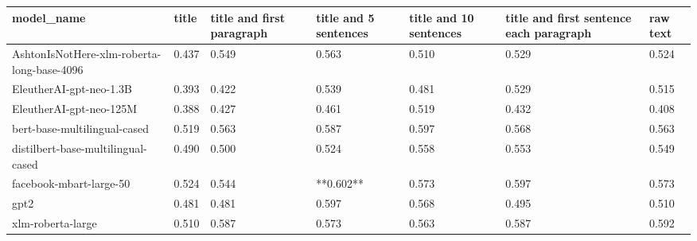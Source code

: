 \begin{tabular}{lllllll}
\toprule
                                model\_name & title & title and first paragraph & title and 5 sentences & title and 10 sentences & title and first sentence each paragraph & raw text \\
\midrule
AshtonIsNotHere-xlm-roberta-long-base-4096 & 0.437 &                     0.549 &                 0.563 &                  0.510 &                                   0.529 &    0.524 \\
                   EleutherAI-gpt-neo-1.3B & 0.393 &                     0.422 &                 0.539 &                  0.481 &                                   0.529 &    0.515 \\
                   EleutherAI-gpt-neo-125M & 0.388 &                     0.427 &                 0.461 &                  0.519 &                                   0.432 &    0.408 \\
              bert-base-multilingual-cased & 0.519 &                     0.563 &                 0.587 &                  0.597 &                                   0.568 &    0.563 \\
        distilbert-base-multilingual-cased & 0.490 &                     0.500 &                 0.524 &                  0.558 &                                   0.553 &    0.549 \\
                   facebook-mbart-large-50 & 0.524 &                     0.544 &             **0.602** &                  0.573 &                                   0.597 &    0.573 \\
                                      gpt2 & 0.481 &                     0.481 &                 0.597 &                  0.568 &                                   0.495 &    0.510 \\
                         xlm-roberta-large & 0.510 &                     0.587 &                 0.573 &                  0.563 &                                   0.587 &    0.592 \\
\bottomrule
\end{tabular}

